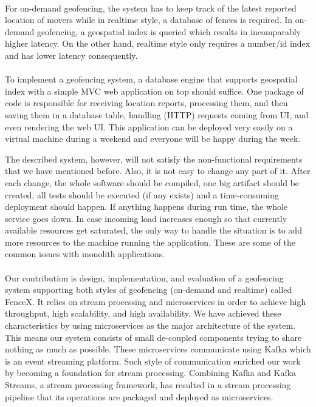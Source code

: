 \documentclass[a4]{report}
\begin{document}
    \paragraph{}
    For on-demand geofencing, the system has to keep track of the latest reported location of movers while in realtime
    style, a database of fences is required.
    In on-demand geofencing, a geospatial index is queried which results in incomparably higher latency.
    On the other hand, realtime style only requires a number/id index and has lower latency consequently.

    \paragraph{}
    To implement a geofencing system, a database engine that supports geospatial index with a simple MVC\cite{mvc}
    web application on top should suffice.
    One package of code is responsible for receiving location reports, processing them, and then saving them in
    a database table, handling (HTTP) requests coming from UI, and even rendering the web UI.
    This application can be deployed very easily on a virtual machine during a weekend and everyone will be happy
    during the week.

    The described system, however, will not satisfy the non-functional requirements that we have mentioned before.
    Also, it is not easy to change any part of it.
    After each change, the whole software should be compiled, one big artifact should be created, all tests should be executed (if any exists) and a time-consuming deployment should happen.
    If anything happens during run time, the whole service goes down.
    In case incoming load increases enough so that currently available resources get saturated, the only way to handle the situation is to add more resources to the machine running the application.
    These are some of the common issues with monolith\cite{monolith} applications.

    \paragraph{}
    Our contribution is design, implementation, and evaluation of a geofencing system supporting both styles of
    geofencing (on-demand and realtime) called FenceX\cite{fencex}.
    It relies on stream processing\cite{making-sense-of-stream-processing} and microservices\cite{microservices} in
    order to achieve high throughput, high scalability, and high availability.
    We have achieved these characteristics by using microservices as the major architecture of the system.
    This means our system consists of small de-coupled components trying to share nothing as much as possible.
    These microservices communicate using Kafka\cite{kafka} which is an event streaming\cite{design-event-driven-systems} platform.
    Such style of communication enriched our work by becoming a foundation for stream processing.
    Combining Kafka and Kafka Streams\cite{KafkaStreams}, a stream processing framework, has resulted in a
    stream processing pipeline that its operations are packaged and deployed as microservices.
\end{document}
